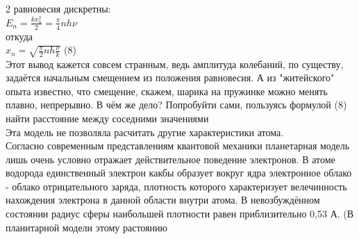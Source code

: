 \begin{multicols}{2}
равновесия дискретны:\\
{\large $E_n=\frac{kx_n^2}{2}=\frac{\pi}{4}nh\nu$\\}
откуда\\
{\large $x_n=\sqrt{\frac{\pi}{2}nh\frac{\nu}{k}}$}  \indent (8)\\
Этот вывод кажется совсем странным, ведь амплитуда колебаний, по существу, задаётся начальным смещением из положения равновесия. А из "житейского" опыта известно, что смещение, скажем, шарика на пружинке можно менять плавно, непрерывно. В чём же дело? Попробуйти сами, пользуясь формулой (8) найти расстояние между соседними значениями\columnbreak \\
Эта модель не позволяла расчитать другие характеристики атома.\\
\indent Согласно современным представлениям квантовой механики планетарная модель лишь очень условно отражает действительное поведение электронов. В атоме водорода единственный электрон какбы образует вокруг ядра электронное облако - облако отрицательного заряда, плотность которого характеризует велечинность нахождения электрона в данной области внутри атома. В невозбуждённом состоянии радиус сферы наибольшей плотности равен приблизительно 0,53 А. (В планитарной модели этому растоянию
\end{multicols}

